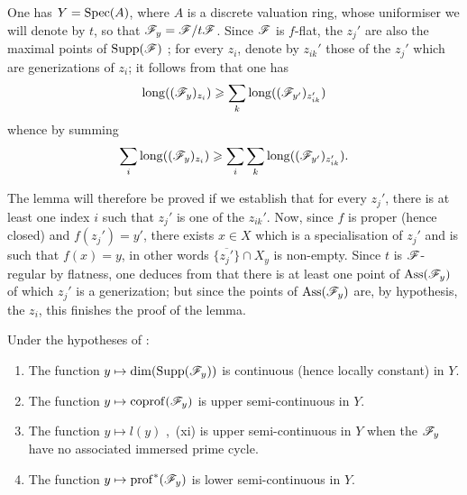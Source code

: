 \begin{env}[12.2.1.3]
One has $Y=\operatorname{Spec}(A)$, where $A$ is a discrete valuation ring, whose uniformiser we will denote by $t$, so that $\mathscr{F}_y=\mathscr{F}/t\mathscr{F}$.
Since $\mathscr{F}$ is $f$-flat, the $z_j'$ are also the maximal points of $\operatorname{Supp}(\mathscr{F})$ ; for every $z_i$, denote by $z_{ik}'$ those of the $z_j'$ which are generizations of $z_i$; it follows from  that one has
\[
  \operatorname{long}((\mathscr{F}_y)_{z_i}) \geqslant \sum_k \operatorname{long}((\mathscr{F}_{y'})_{z_{ik}'})
\]
whence by summing
\[
  \sum_i \operatorname{long}((\mathscr{F}_y)_{z_i}) \geqslant \sum_i \sum_k \operatorname{long}((\mathscr{F}_{y'})_{z_{ik}'}).
\]

The lemma will therefore be proved if we establish that for every $z_j'$, there is at least one index $i$ such that $z_j'$ is one of the $z_{ik}'$.
Now, since $f$ is proper (hence closed) and $f(z_j')=y'$, there exists $x\in X$ which is a specialisation of $z_j'$ and is such that $f(x)=y$, in other words $\overline{\{z_j'\}}\cap X_y$ is non-empty.
Since $t$ is $\mathscr{F}$-regular by flatness, one deduces from  that there is at least one point of $\operatorname{Ass}(\mathscr{F}_y)$ of which $z_j'$ is a generization; but since the points of $\operatorname{Ass}(\mathscr{F}_y)$ are, by hypothesis, the $z_i$, this finishes the proof of the lemma.
\end{env}

\begin{corollary}[12.2.2]
\label{IV.12.2.2}
Under the hypotheses of :
\begin{enumerate}[label=(\roman*)]
  \item The function $y\mapsto\dim(\operatorname{Supp}(\mathscr{F}_y))$ is continuous (hence locally constant) in $Y$.
  \item The function $y\mapsto\operatorname{coprof}(\mathscr{F}_y)$  is upper semi-continuous in $Y$.
  \item The function $y\mapsto l(y)$ ,~(xi) is upper semi-continuous in $Y$ when the $\mathscr{F}_y$ have no associated immersed prime cycle.
  \item The function $y\mapsto\operatorname{prof}^*(\mathscr{F}_y)$  is lower semi-continuous in $Y$.
\end{enumerate}
\end{corollary}


